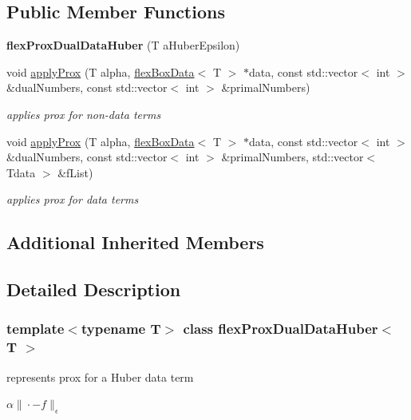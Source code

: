 \subsection*{Public Member Functions}
\begin{DoxyCompactItemize}
\item 
\mbox{\label{classflex_prox_dual_data_huber_a22b6028c5e11ac8560c528a5ce82a3af}} 
{\bfseries flex\+Prox\+Dual\+Data\+Huber} (T a\+Huber\+Epsilon)
\item 
void \hyperlink{classflex_prox_dual_data_huber_ac085f34619c3d747b09a2b369a11dcd5}{apply\+Prox} (T alpha, \hyperlink{classflex_box_data}{flex\+Box\+Data}$<$ T $>$ $\ast$data, const std\+::vector$<$ int $>$ \&dual\+Numbers, const std\+::vector$<$ int $>$ \&primal\+Numbers)
\begin{DoxyCompactList}\small\item\em applies prox for non-\/data terms \end{DoxyCompactList}\item 
void \hyperlink{classflex_prox_dual_data_huber_ab1c0bbd454ee7fe65592ff8beda4aaa5}{apply\+Prox} (T alpha, \hyperlink{classflex_box_data}{flex\+Box\+Data}$<$ T $>$ $\ast$data, const std\+::vector$<$ int $>$ \&dual\+Numbers, const std\+::vector$<$ int $>$ \&primal\+Numbers, std\+::vector$<$ Tdata $>$ \&f\+List)
\begin{DoxyCompactList}\small\item\em applies prox for data terms \end{DoxyCompactList}\end{DoxyCompactItemize}
\subsection*{Additional Inherited Members}


\subsection{Detailed Description}
\subsubsection*{template$<$typename T$>$\newline
class flex\+Prox\+Dual\+Data\+Huber$<$ T $>$}

represents prox for a Huber data term 

$ \alpha\|\cdot-f\|_\epsilon $ 

